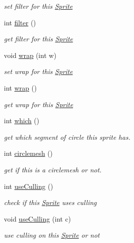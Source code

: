 \begin{DoxyCompactItemize}
\begin{DoxyCompactList}\small\item\em set filter for this \hyperlink{class_sprite}{Sprite} \end{DoxyCompactList}\item 
int \hyperlink{class_sprite_a7c183f627af8bf9d416189f4dc81383b}{filter} ()
\begin{DoxyCompactList}\small\item\em get filter for this \hyperlink{class_sprite}{Sprite} \end{DoxyCompactList}\item 
void \hyperlink{class_sprite_a0e10957a274ba27a38601eac1fda210c}{wrap} (int w)
\begin{DoxyCompactList}\small\item\em set wrap for this \hyperlink{class_sprite}{Sprite} \end{DoxyCompactList}\item 
int \hyperlink{class_sprite_a5b8eb7dc4c186c951ebf1b424cdda27f}{wrap} ()
\begin{DoxyCompactList}\small\item\em get wrap for this \hyperlink{class_sprite}{Sprite} \end{DoxyCompactList}\item 
int \hyperlink{class_sprite_a0bfc3bb83da3bef06696cb55b5c47465}{which} ()
\begin{DoxyCompactList}\small\item\em get which segment of circle this sprite has. \end{DoxyCompactList}\item 
int \hyperlink{class_sprite_ad7827d61c0d5f95499df3bcc569cd33c}{circlemesh} ()
\begin{DoxyCompactList}\small\item\em get if this is a circlemesh or not. \end{DoxyCompactList}\item 
int \hyperlink{class_sprite_af008075858671c5cfad4fe679b93273b}{use\+Culling} ()
\begin{DoxyCompactList}\small\item\em check if this \hyperlink{class_sprite}{Sprite} uses culling \end{DoxyCompactList}\item 
void \hyperlink{class_sprite_acf75b5a4882d1cb20a77244feeb0d2f3}{use\+Culling} (int c)
\begin{DoxyCompactList}\small\item\em use culling on this \hyperlink{class_sprite}{Sprite} or not \end{DoxyCompactList}\end{DoxyCompactItemize}
